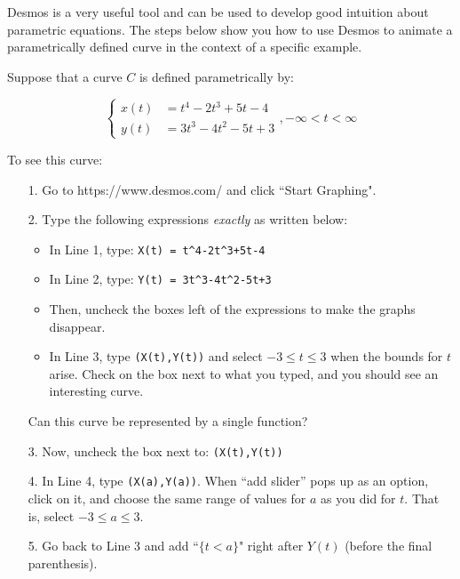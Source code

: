 \documentclass{ximera}
\author{Jim Talamo}
\begin{document}
\begin{exercise}
Desmos is a very useful tool and can be used to develop good intuition about parametric equations.  The steps below show you how to use Desmos to animate a parametrically defined curve in the context of a specific example.

Suppose that a curve $C$ is defined parametrically by:

\[
\begin{cases}
x(t)&=  t^4-2t^3+5t-4\\
y(t)&=  3t^3-4t^2-5t+3
\end{cases} 
, -\infty < t < \infty
\]

To see this curve:

\begin{itemize}
\item[1.] Go to https://www.desmos.com/ and click ``Start Graphing".
\item[2.] Type the following expressions \emph{exactly} as written below:
\begin{itemize}
\item In Line 1, type: \verb|X(t) = t^4-2t^3+5t-4|  
\item In Line 2, type: \verb|Y(t) = 3t^3-4t^2-5t+3|
\item Then, uncheck the boxes left of the expressions to make the graphs disappear.
\item In Line 3, type \verb|(X(t),Y(t))| and select $-3\leq t \leq3$ when the bounds for $t$ arise.  Check on the box next to what you typed, and you should see an interesting curve.
\end{itemize}
Can this curve be represented by a single function?

\begin{multipleChoice}
\end{multipleChoice}

\item[3.] Now, uncheck the box next to: \verb|(X(t),Y(t))|
\item[4.] In Line 4, type \verb|(X(a),Y(a))|.  When ``add slider'' pops up as an option, click on it, and choose the same range of values for $a$ as you did for $t$.  That is, select $-3 \leq a \leq 3$.
\item[5.] Go back to Line 3 and add ``$\{t<a\}$" right after $Y(t)$ (before the final parenthesis).  


\end{itemize}
\end{exercise}
\end{document}
